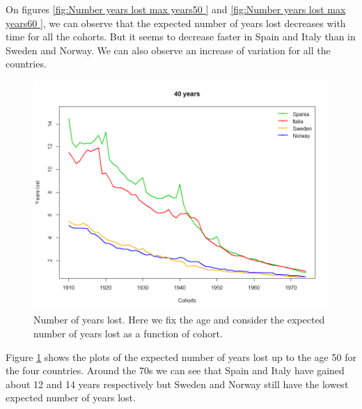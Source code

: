 On figures \ref{fig:Number years lost max years50 } and \ref{fig:Number years lost max years60 }, we can observe that the expected number of years lost decreases with time for all the cohorts. 
But it seems to decrease faster in Spain and Italy than in Sweden and Norway.
We can also observe an increase of variation for all the countries.
            
            
            
                                    
              \begin{figure}[tbh]
             \centering
              \includegraphics[width=0.8\linewidth]{figures/antal_tapteAA_age40.png}
              \caption{Number of years lost. Here we fix the age and consider the expected number of years lost as a function of cohort.}
              \label{fig:Number years lost max years40 }
            \end{figure}          

Figure \ref{fig:Number years lost max years40 }  shows the plots of the expected number of years lost up to the age 50 for the four countries. 
Around the 70s we can see that Spain and Italy have gained about 12 and 14 years respectively but Sweden and Norway still have the lowest expected number of years lost.
            

            
                        
